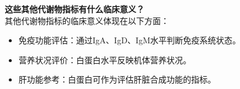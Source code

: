 \documentclass[UTF8]{ctexart}
\begin{document}
\begin{tcolorbox}[
    enhanced,
    colback=lightpurple!10, %
    colframe=white,  %
    arc=3mm,
    boxrule=0.5pt,
    width=\textwidth,
    top=8pt,
    bottom=8pt
]
{\small{\color{lightpurple}\faQuestionCircle}\quad \textbf{这些其他代谢物指标有什么临床意义？}\\
{\color{orange!50}\faComments}\quad 其他代谢物指标的临床意义体现在以下方面：
\begin{itemize}
    \item 免疫功能评估：通过IgA、IgD、IgM水平判断免疫系统状态。
    \item 营养状况评价：白蛋白水平反映机体营养状况。
    \item 肝功能参考：白蛋白可作为评估肝脏合成功能的指标。
\end{itemize}
}
\end{tcolorbox}
\vspace{-0.5cm}
\end{document}
